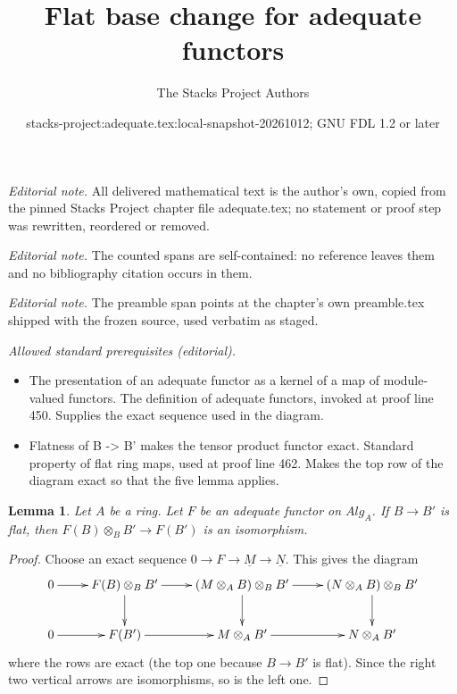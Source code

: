 \documentclass{stacks-project}
\title{Flat base change for adequate functors}
\author{The Stacks Project Authors}
\date{stacks-project:adequate.tex:local-snapshot-20261012; GNU FDL 1.2 or later}
\theoremstyle{plain}
\newtheorem{lemma}[subsection]{Lemma}
\theoremstyle{definition}
\theoremstyle{remark}
\numberwithin{equation}{subsection}
\begin{document}
\maketitle
\noindent\textit{Editorial note.} All delivered mathematical text is the author's own, copied from the pinned Stacks Project chapter file adequate.tex; no statement or proof step was rewritten, reordered or removed.\par\medskip
\noindent\textit{Editorial note.} The counted spans are self-contained: no reference leaves them and no bibliography citation occurs in them.\par\medskip
\noindent\textit{Editorial note.} The preamble span points at the chapter's own preamble.tex shipped with the frozen source, used verbatim as staged.\par\medskip
\noindent\textit{Allowed standard prerequisites (editorial).}\begin{itemize}
\item The presentation of an adequate functor as a kernel of a map of module-valued functors. The definition of adequate functors, invoked at proof line 450. Supplies the exact sequence used in the diagram.
\item Flatness of B -> B' makes the tensor product functor exact. Standard property of flat ring maps, used at proof line 462. Makes the top row of the diagram exact so that the five lemma applies.
\end{itemize}\medskip
\begin{lemma}
\label{lemma-adequate-flat}
Let $A$ be a ring.
Let $F$ be an adequate functor on $\textit{Alg}_A$.
If $B \to B'$ is flat, then $F(B) \otimes_B B' \to F(B')$
is an isomorphism.
\end{lemma}

\begin{proof}
Choose an exact sequence $0 \to F \to \underline{M} \to \underline{N}$.
This gives the diagram
$$
\xymatrix{
0 \ar[r] & F(B) \otimes_B B' \ar[r] \ar[d] &
(M \otimes_A B)\otimes_B B' \ar[r] \ar[d] &
(N \otimes_A B)\otimes_B B' \ar[d] \\
0 \ar[r] & F(B') \ar[r] &
M \otimes_A B' \ar[r] &
N \otimes_A B'
}
$$
where the rows are exact (the top one because $B \to B'$ is flat).
Since the right two vertical arrows are isomorphisms, so is the
left one.
\end{proof}
\end{document}
